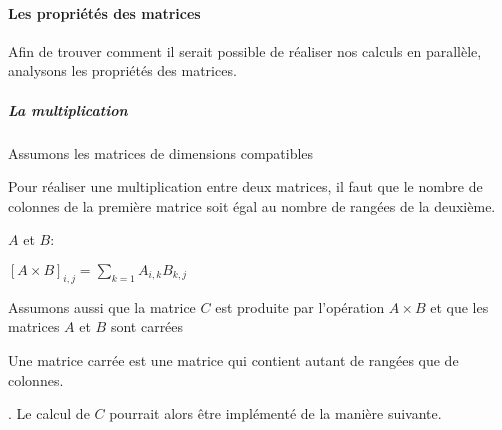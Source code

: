 \documentclass[letterpaper,10pt,french]{sphinxmanual}
\begin{document}
\paragraph{Les propriétés des matrices}
\label{\detokenize{preprocessing:les-proprietes-des-matrices}}
Afin de trouver comment il serait possible de réaliser nos calculs en parallèle, analysons les propriétés des matrices.


\subparagraph{La multiplication}
\label{\detokenize{preprocessing:la-multiplication}}
Assumons les matrices de dimensions compatibles%
\begin{footnote}[21]\sphinxAtStartFootnote
Pour réaliser une multiplication entre deux matrices, il faut que le nombre de colonnes de la première matrice soit égal au nombre de rangées de la deuxième.
%
\end{footnote} \(A\) et \(B\):

\([A \times B]_{i,j} = \displaystyle\sum_{k=1}A_{i,k}B_{k,j}\)

Assumons aussi que la matrice \(C\) est produite par l’opération \(A \times B\) et que les matrices \(A\) et \(B\) sont carrées%
\begin{footnote}[22]\sphinxAtStartFootnote
Une matrice carrée est une matrice qui contient autant de rangées que de colonnes.
%
\end{footnote}.  Le calcul de \(C\) pourrait alors être implémenté de la manière suivante.

\begin{sphinxVerbatim}[commandchars=\\\{\}]
  \PYG{p}{[}\PYG{p}{[}\PYG{p}{]}
    \PYG{p}{[}\PYG{p}{]}
    \PYG{p}{[}\PYG{p}{]}\PYG{p}{]}
   
	   \PYG{p}{[}\PYG{p}{]}
		   \PYG{p}{)}
			\PYG{p}{[}\PYG{p}{]}\PYG{p}{[}\PYG{p}{]}  \PYG{p}{[}\PYG{p}{]}\PYG{p}{[}\PYG{p}{]}  \PYG{p}{[}\PYG{p}{]}\PYG{p}{[}\PYG{p}{]}
\end{sphinxVerbatim}
\end{document}
